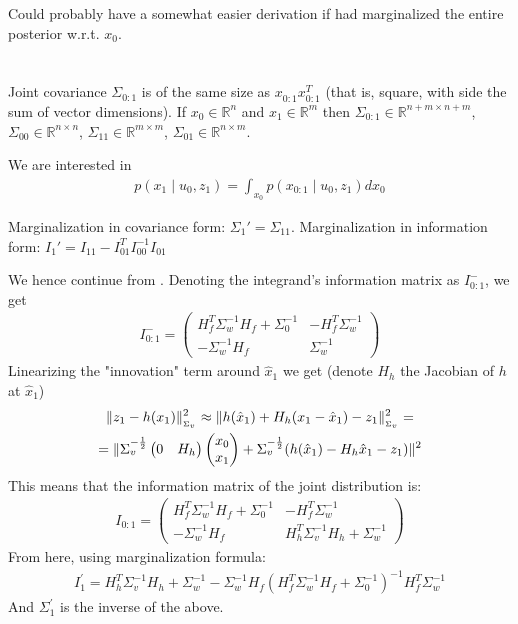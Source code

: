 \documentclass[a4paper]{scrreprt}
\begin{document}
Could probably have a somewhat easier derivation if had marginalized the entire 
posterior w.r.t. $x_0$. 

\section{}
Joint covariance $\Sigma_{0:1}$ is of the same size as $x_{0:1}^{ } x_{0:1}^T$ 
(that is, square, 
with side the sum of vector dimensions). If $x_0\in \mathbb{R}^n$ and $x_1\in 
\mathbb{R}^m$ then $\Sigma_{0:1}\in \mathbb{R}^{n+m\times n+m}$, 
$\Sigma_{00}\in\mathbb{R}^{n\times n}$, $\Sigma_{11}\in\mathbb{R}^{m\times m}$, 
$\Sigma_{01}\in\mathbb{R}^{n\times m}$. 

We are interested in
\begin{gather}
	p(x_1\mid u_0, z_1) = \int_{x_0} p(x_{0:1}\mid u_0, z_1) dx_0
\end{gather}

Marginalization in covariance form: $\Sigma_1' = \Sigma_{11}$.  Marginalization 
in information form: $I_1' = I_{11} - I_{01}^TI_{00}^{-1}I_{01}$

We hence continue from . Denoting the integrand's 
information matrix as $I_{0:1}^-$, we get 
\begin{gather}
	I_{0:1}^- = 
	\begin{pmatrix}
	H_f^T\Sigma_w^{-1}H_f + \Sigma_0^{-1} & -H_f^T\Sigma_w^{-1} \\
	-\Sigma_w^{-1}H_f & \Sigma_w^{-1}
	\end{pmatrix}
\end{gather}
Linearizing the "innovation" term around $\hat{x}_1$ we get (denote $H_h$ the 
Jacobian of $h$ at $\hat{x}_1$)
\begin{gather}
	\nrmsq{_{\Sigma_v}}{z_1-h(x_1)} \approx
	\nrmsq{_{\Sigma_v}}{h(\hat{x}_1) + H_h (x_1-\hat{x}_1) - z_1} =
	\\
	= \nrmsq{}{
	\Sigma_v^{-\frac{1}{2}}\begin{pmatrix}
	0 & H_h
	\end{pmatrix}
	\begin{pmatrix}
	x_0 \\ x_1
	\end{pmatrix}
	+ \Sigma_v^{-\frac{1}{2}}(h(\hat{x}_1) - H_h \hat{x}_1 - z_1)}
\end{gather}
This means that the information matrix of the joint distribution is: 
\begin{gather}
	I_{0:1} = 	
	\begin{pmatrix}
		H_f^T\Sigma_w^{-1}H_f + \Sigma_0^{-1} & -H_f^T\Sigma_w^{-1} \\
		-\Sigma_w^{-1}H_f & H_h^T\Sigma_v^{-1}H_h + \Sigma_w^{-1}
		\end{pmatrix}
\end{gather}
From here, using marginalization formula: 
\begin{gather}
	I_1^\prime = 
	H_h^T\Sigma_v^{-1}H_h + \Sigma_w^{-1} - 
	\Sigma_w^{-1}H_f\left(H_f^T\Sigma_w^{-1}H_f + \Sigma_0^{-1}\right)^{-1}
	H_f^T\Sigma_w^{-1}
\end{gather}
And $\Sigma_1^\prime$ is the inverse of the above. 
\end{document}
